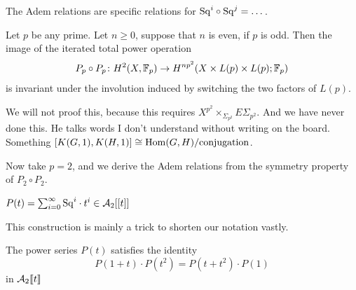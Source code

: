 \documentclass[language=english]{TemplateLecture}
\begin{document}
The Adem relations are specific relations for \(\mathrm{Sq}^i \circ \mathrm{Sq}^j = \dots\).

\begin{thm}{}{}
    Let \(p\) be any prime. Let \(n \geq 0\), suppose that \(n\) is even, if \(p\) is odd. Then the image of the iterated total power operation
    \[P_p\circ P_p \colon H^2(X, \mathbb{F}_p) \to H^{np^2}(X\times L(p)\times L(p); \mathbb{F}_p)\]
    is invariant under the involution induced by switching the two factors of \(L(p)\).
\end{thm}

We will not proof this, because this requires \(X^{p^2}\times_{\Sigma_{p^2}} E\Sigma_{p^2}\). And we have never done this. He talks words I don't understand without writing on the board. Something \([K(G,1), K(H,1)]\cong \operatorname{Hom}(G,H)/\text{conjugation}\).

Now take \(p=2\), and we derive the Adem relations from the symmetry property of \(P_2 \circ P_2\).

\begin{construction}
    \(P(t) = \sum_{i = 0}^\infty \mathrm{Sq}^i \cdot t^i \in \mathcal{A}_2[[t]]\)
\end{construction}
This construction is mainly a trick to shorten our notation vastly.

\begin{proposition}
    The power series \(P(t)\) satisfies the identity
    \[P(1+t) \cdot P(t^2) = P(t + t^2) \cdot P(1)\]
    in \(\mathcal{A}_2\llbracket t\rrbracket\)
\end{proposition}
\end{document}

